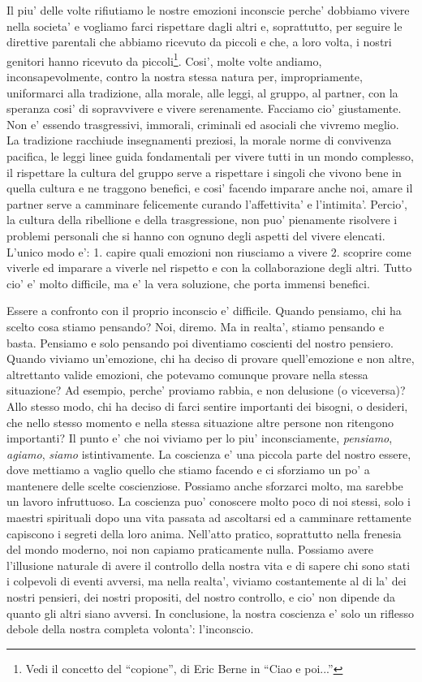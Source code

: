 Il piu' delle volte rifiutiamo le nostre emozioni inconscie perche' dobbiamo vivere nella societa' e vogliamo farci rispettare dagli altri e, soprattutto, per seguire le direttive parentali che abbiamo ricevuto da piccoli e che, a loro volta, i nostri genitori hanno ricevuto da piccoli\footnote{Vedi il concetto del ``copione'', di Eric Berne in ``Ciao e poi...''}. Cosi', molte volte andiamo, inconsapevolmente, contro la nostra stessa natura per, impropriamente, uniformarci alla tradizione, alla morale, alle leggi, al gruppo, al partner, con la speranza cosi' di sopravvivere e vivere serenamente. Facciamo cio' giustamente. Non e' essendo trasgressivi, immorali, criminali ed asociali che vivremo meglio. La tradizione racchiude insegnamenti preziosi, la morale norme di convivenza pacifica, le leggi linee guida fondamentali per vivere tutti in un mondo complesso, il rispettare la cultura del gruppo serve a rispettare i singoli che vivono bene in quella cultura e ne traggono benefici, e cosi' facendo imparare anche noi, amare il partner serve a camminare felicemente curando l'affettivita' e l'intimita'. Percio', la cultura della ribellione e della trasgressione, non puo' pienamente risolvere i problemi personali che si hanno con ognuno degli aspetti del vivere elencati. L'unico modo e': 1. capire quali emozioni non riusciamo a vivere 2. scoprire come viverle ed imparare a viverle nel rispetto e con la collaborazione degli altri. Tutto cio' e' molto difficile, ma e' la vera soluzione, che porta immensi benefici. 

Essere a confronto con il proprio inconscio e' difficile. 
Quando pensiamo, chi ha scelto cosa stiamo pensando? Noi, diremo. Ma in realta', stiamo pensando e basta. Pensiamo e solo pensando poi diventiamo coscienti del nostro pensiero.
Quando viviamo un'emozione, chi ha deciso di provare quell'emozione e non altre, altrettanto valide emozioni, che potevamo comunque provare nella stessa situazione? Ad esempio, perche' proviamo rabbia, e non delusione (o viceversa)?
Allo stesso modo, chi ha deciso di farci sentire importanti dei bisogni, o desideri, che nello stesso momento e nella stessa situazione altre persone non ritengono importanti? Il punto e' che noi viviamo per lo piu' inconsciamente, \emph{pensiamo}, \emph{agiamo}, \emph{siamo} istintivamente. La coscienza e' una piccola parte del nostro essere, dove mettiamo a vaglio quello che stiamo facendo e ci sforziamo un po' a mantenere delle scelte coscienziose. Possiamo anche sforzarci molto, ma sarebbe un lavoro infruttuoso. La coscienza puo' conoscere molto poco di noi stessi, solo i maestri spirituali dopo una vita passata ad ascoltarsi ed a camminare rettamente capiscono i segreti della loro anima. Nell'atto pratico, soprattutto nella frenesia del mondo moderno, noi non capiamo praticamente nulla. Possiamo avere l'illusione naturale di avere il controllo della nostra vita e di sapere chi sono stati i colpevoli di eventi avversi, ma nella realta', viviamo costantemente al di la' dei nostri pensieri, dei nostri propositi, del nostro controllo, e cio' non dipende da quanto gli altri siano avversi. In conclusione, la nostra coscienza e' solo un riflesso debole della nostra completa volonta': l'inconscio.

